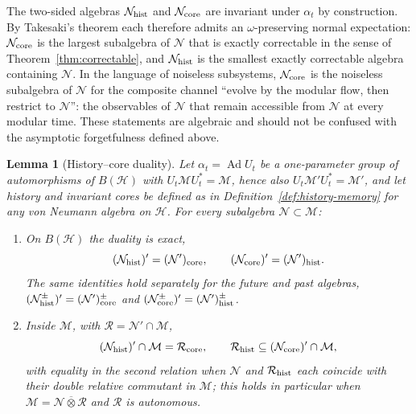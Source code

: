 \documentclass[a4paper,11pt]{article}
\newtheorem{lemma}[theorem]{Lemma}
\theoremstyle{definition}
\newcommand{\mR}{\mathcal{R}}
\newcommand{\mN}{\mathcal{N}}
\newcommand{\mM}{\mathcal{M}}
\begin{document}
The two-sided algebras $\mN_{\rm hist}$ and $\mN_{\rm core}$ are invariant under $\alpha_t$ by construction. By Takesaki's theorem each therefore admits an $\omega$-preserving normal expectation: $\mN_{\rm core}$ is the largest subalgebra of $\mN$ that is exactly correctable in the sense of Theorem~\ref{thm:correctable}, and $\mN_{\rm hist}$ is the smallest exactly correctable algebra containing $\mN$. In the language of noiseless subsystems, $\mN_{\rm core}$ is the noiseless subalgebra of $\mN$ for the composite channel ``evolve by the modular flow, then restrict to $\mN$'': the observables of $\mN$ that remain accessible from $\mN$ at every modular time. These statements are algebraic and should not be confused with the asymptotic forgetfulness defined above.

\begin{lemma}[History--core duality]\label{lem:history-memory}
Let $\alpha_t=\operatorname{Ad}U_t$ be a one-parameter group of automorphisms of $B(\mathcal H)$ with $U_t\mM U_t^*=\mM$, hence also $U_t\mM'U_t^*=\mM'$, and let history and invariant cores be defined as in Definition~\ref{def:history-memory} for any von Neumann algebra on $\mathcal H$. For every subalgebra $\mN\subset\mM$:
\begin{enumerate}
 \item[\rm(a)] On $B(\mathcal H)$ the duality is exact,
 \begin{equation}
  (\mN_{\rm hist})'=(\mN')_{\rm core},\qquad (\mN_{\rm core})'=(\mN')_{\rm hist}.
  \label{eq:history-memory-BH}
 \end{equation}
 The same identities hold separately for the future and past algebras,
 $(\mN_{\rm hist}^{\pm})'=(\mN')_{\rm core}^{\pm}$ and
 $(\mN_{\rm core}^{\pm})'=(\mN')_{\rm hist}^{\pm}$.
 \item[\rm(b)] Inside $\mM$, with $\mR=\mN'\cap\mM$,
 \begin{equation}
  (\mN_{\rm hist})'\cap\mM=\mR_{\rm core},\qquad
  \mR_{\rm hist}\subseteq(\mN_{\rm core})'\cap\mM ,
  \label{eq:history-memory}
 \end{equation}
 with equality in the second relation when $\mN$ and $\mR_{\rm hist}$ each coincide with their double relative commutant in $\mM$; this holds in particular when $\mM=\mN\overline\otimes\mR$ and $\mR$ is autonomous.
\end{enumerate}
\end{lemma}
\end{document}
